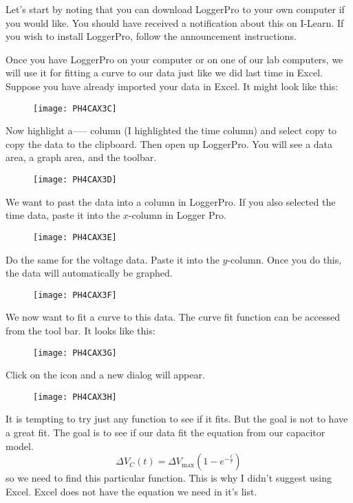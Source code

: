 Let's start by noting that you can download LoggerPro to your own computer
if you would like. You should have received a notification about this on
I-Learn. If you wish to install LoggerPro, follow the announcement
instructions.

Once you have LoggerPro on your computer or on one of our lab computers, we
will use it for fitting a curve to our data just like we did last time in
Excel. Suppose you have already imported your data in Excel. It might look
like this:

\begin{figure}[h!]
\texttt{[image: PH4CAX3C]}
\end{figure}Now highlight a----- column (I
highlighted the time column) and select copy to copy the data to the
clipboard. Then open up LoggerPro. You will see a data area, a graph area,
and the toolbar.\begin{figure}[h!]
\texttt{[image: PH4CAX3D]}
\end{figure}We want to past the data into a
column in LoggerPro. If you also selected the time data, paste it into the $%
x $-column in Logger Pro. \begin{figure}[h!]
\texttt{[image: PH4CAX3E]}
\end{figure}

Do the same for the voltage data. Paste it into the $y$-column. Once you do
this, the data will automatically be graphed. \begin{figure}[h!]
\texttt{[image: PH4CAX3F]}
\end{figure}We now want to fit a curve to
this data. The curve fit function can be accessed from the tool bar. It
looks like this: \begin{figure}[h!]
\texttt{[image: PH4CAX3G]}
\end{figure}Click on the icon and a new
dialog will appear. \begin{figure}[h!]
\texttt{[image: PH4CAX3H]}
\end{figure}

It is tempting to try just any function to see if it fits. But the goal is
not to have a great fit. The goal is to see if our data fit the equation
from our capacitor model. 
\begin{equation*}
\Delta V_{C}\left( t\right) =\Delta V_{\max }\left( 1-e^{-\frac{t}{\tau }%
}\right)
\end{equation*}%
so we need to find this particular function. This is why I didn't suggest
using Excel. Excel does not have the equation we need in it's list.

